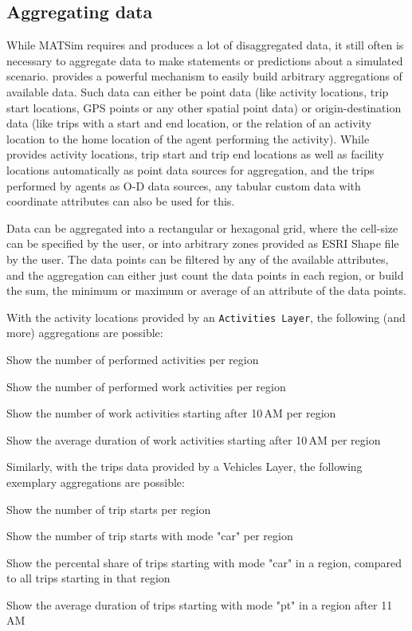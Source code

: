 \subsection{Aggregating data}
While MATSim requires and produces a lot of disaggregated data, it still often
is necessary to aggregate data to make statements or predictions about a
simulated scenario. \Via{} provides a powerful mechanism to easily build
arbitrary aggregations of available data. Such data can either be point data
(like activity locations, trip start locations, GPS points or any other spatial
point data) or origin-destination data (like trips with a start and end
location, or the relation of an activity location to the home location of the
agent performing the activity). While \Via{} provides activity locations, trip
start and trip end locations as well as facility locations automatically as point data
sources for aggregation, and the trips performed by agents as O-D data sources,
any tabular custom data with coordinate attributes can also be used for this. 

Data can be aggregated into a rectangular or hexagonal grid, where the cell-size
can be specified by the user, or into arbitrary zones provided as ESRI
Shape file by the user. The data points can be filtered by any of the
available attributes, and the aggregation can either just count the data points
in each region, or build the sum, the minimum or maximum or average of an
attribute of the data points.

With the activity locations provided by an
\lstinline|Activities Layer|, the following (and more) aggregations are possible:
\begin{compactitem}
  \item Show the number of performed activities per region
  \item Show the number of performed work activities per region
  \item Show the number of work activities starting after 10\,AM per region
  \item Show the average duration of work activities starting after 10\,AM per
  region
\end{compactitem}
Similarly, with the trips data provided by a Vehicles Layer, the following
exemplary aggregations are possible:
\begin{compactitem}
  \item Show the number of trip starts per region
  \item Show the number of trip starts with mode "car" per region
  \item Show the percental share of trips starting with mode "car" in a
  region, compared to all trips starting in that region
  \item Show the average duration of trips starting with mode "pt" in a region
  after 11\,AM
\end{compactitem}

